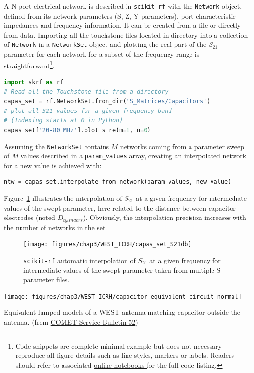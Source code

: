 {A N-port electrical network is described in \texttt{scikit-rf} with the \texttt{Network} object, defined from its network parameters (S, Z, Y-parameters), port characteristic impedances and frequency information. It can be created from a file or directly from data. Importing all the touchstone files located in directory into a collection of \texttt{Network} in a \texttt{NetworkSet} object and plotting the real part of the $S_{21}$ parameter for each network for a subset of the frequency range is straightforward\footnote{Code snippets are complete minimal example but does not necessary reproduce all figure details such as line styles, markers or labels. Readers should refer to associated \href{https://doi.org/10.5281/zenodo.2668370}{online notebooks }for the full code listing.}:

\begin{lstlisting}[language=Python]
import skrf as rf
# Read all the Touchstone file from a directory
capas_set = rf.NetworkSet.from_dir('S_Matrices/Capacitors')
# plot all S21 values for a given frequency band
# (Indexing starts at 0 in Python)
capas_set['20-80 MHz'].plot_s_re(m=1, n=0)
\end{lstlisting}

Assuming the \texttt{NetworkSet} contains $M$ networks coming from a parameter sweep of $M$ values described in a \texttt{param\_values} array, creating an interpolated network for a new value is achieved with:

\begin{lstlisting}[language=Python]
ntw = capas_set.interpolate_from_network(param_values, new_value)\end{lstlisting}

Figure~\ref{fig:capassets21db} illustrates the interpolation of $S_{21}$ at a given frequency for intermediate values of the swept parameter, here related to the distance between capacitor electrodes (noted $D_{cylinders}$). Obviously, the interpolation precision increases with the number of networks in the set.

\begin{figure}
	\centering
	\texttt{[image: figures/chap3/WEST\_ICRH/capas\_set\_S21db]}
	\caption{\texttt{scikit-rf} automatic interpolation of $S_{21}$ at a given frequency for intermediate values of the swept parameter taken from multiple S-parameter files. }
	\label{fig:capassets21db}
\end{figure}


\begin{marginfigure}[-5cm]
	\centering
	\texttt{[image: figures/chap3/WEST\_ICRH/capacitor\_equivalent\_circuit\_normal]}
	\caption{Equivalent lumped models of a WEST antenna matching capacitor outside the antenna. (from 	\href{https://www.comet-pct.com/getmedia/fb744f1b-1125-4c91-8af3-e058fa56a3bd/SB-52_Technical_Recommendations_and_General_Instructions_for_Vacuum_Capacitors.aspx}{COMET Service Bulletin-52})}
	\label{fig:capacitor_equivalent_circuit_normal}	  
\end{marginfigure}

}
